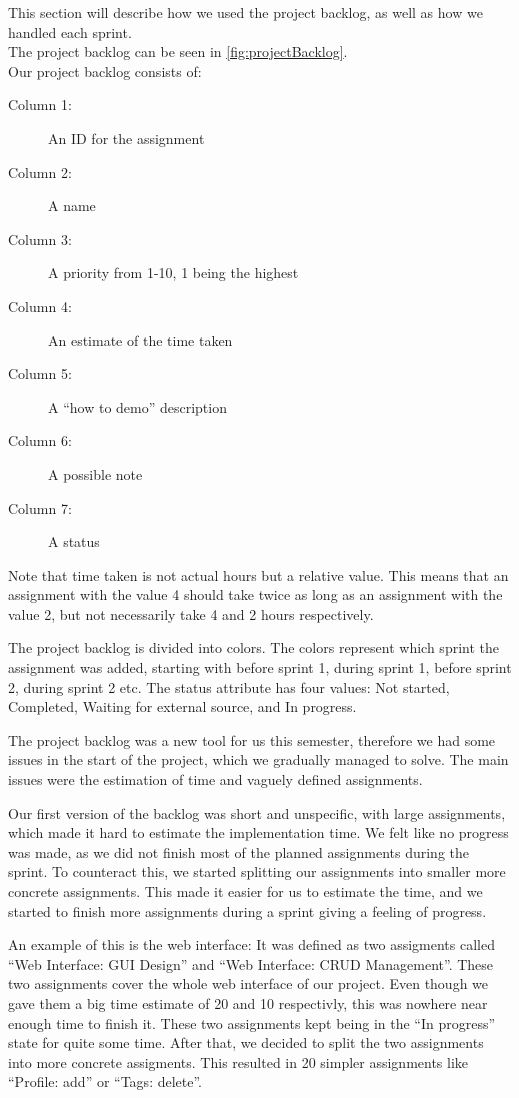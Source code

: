 This section will describe how we used the project backlog, as well as how we handled each sprint. \\

The project backlog can be seen in \autoref{fig:projectBacklog}. \\

Our project backlog consists of: 
\begin{description}
  \item[Column 1:] An ID for the assignment
  \item[Column 2:] A name 
  \item[Column 3:] A priority from 1-10, 1 being the highest
  \item[Column 4:] An estimate of the time taken
  \item[Column 5:] A ``how to demo'' description
  \item[Column 6:] A possible note
  \item[Column 7:] A status
\end{description}
Note that time taken is not actual hours but a relative value. This means that an assignment with the value 4 should take twice as long as an assignment with the value 2, but not necessarily take 4 and 2 hours respectively.

The project backlog is divided into colors. The colors represent which sprint the assignment was added, starting with before sprint 1, during sprint 1, before sprint 2, during sprint 2 etc. The status attribute has four values: Not started, Completed, Waiting for external source, and In progress.

The project backlog was a new tool for us this semester, therefore we had some issues in the start of the project, which we gradually managed to solve. The main issues were the estimation of time and vaguely defined assignments. 

Our first version of the backlog was short and unspecific, with large assignments, which made it hard to estimate the implementation time. We felt like no progress was made, as we did not finish most of the planned assignments during the sprint. To counteract this, we started splitting our assignments into smaller more concrete assignments. This made it easier for us to estimate the time, and we started to finish more assignments during a sprint giving a feeling of progress. 

An example of this is the web interface: It was defined as two assigments called ``Web Interface: GUI Design'' and ``Web Interface: CRUD Management''. These two assignments cover the whole web interface of our project. Even though we gave them a big time estimate of 20 and 10 respectivly, this was nowhere near enough time to finish it. These two assignments kept being in the ``In progress'' state for quite some time. After that, we decided to split the two assignments into more concrete assigments. This resulted in 20 simpler assignments like ``Profile: add'' or ``Tags: delete''. 

